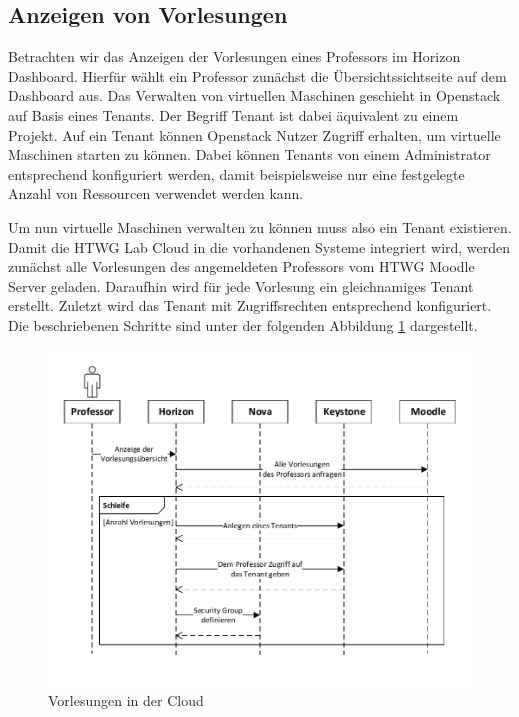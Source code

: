 \newpage
\subsection{Anzeigen von Vorlesungen}
Betrachten wir das Anzeigen der Vorlesungen eines Professors im Horizon Dashboard.
Hierfür wählt ein Professor zunächst die Übersichtssichtseite auf dem Dashboard aus.
Das Verwalten von virtuellen Maschinen geschieht in Openstack auf Basis eines
Tenants. Der Begriff Tenant ist dabei äquivalent zu einem Projekt. 
Auf ein Tenant können Openstack Nutzer Zugriff erhalten, um virtuelle Maschinen starten
zu können. Dabei können Tenants von einem Administrator entsprechend konfiguriert werden, damit
beispielsweise nur eine festgelegte Anzahl von Ressourcen verwendet werden kann.

Um nun virtuelle Maschinen verwalten zu können muss also ein Tenant existieren.
Damit die HTWG Lab Cloud in die vorhandenen Systeme integriert wird, werden zunächst
alle Vorlesungen des angemeldeten Professors vom HTWG Moodle Server geladen.
Daraufhin wird für jede Vorlesung ein gleichnamiges Tenant erstellt. Zuletzt wird das Tenant
mit Zugriffsrechten entsprechend konfiguriert. Die beschriebenen Schritte sind unter der folgenden
Abbildung \ref{createTenants} dargestellt.

\begin{figure}[H]
	\centering
	\includegraphics[scale=0.7]{img/createTenants.pdf}
\caption{Vorlesungen in der Cloud}
\label{createTenants}
\FloatBarrier
\end{figure}


